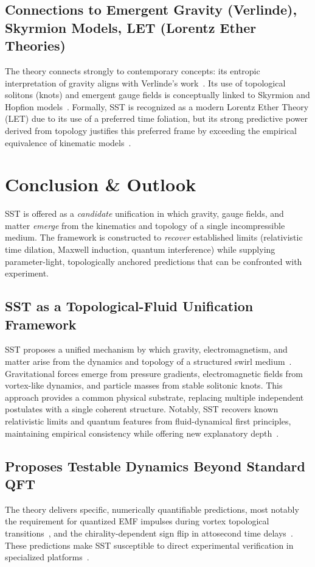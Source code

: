 \documentclass[10pt,reprint,aps,onecolumn,nofootinbib]{revtex4-2}
\begin{document}
\subsection*{Connections to Emergent Gravity (Verlinde), Skyrmion Models, LET (Lorentz Ether Theories)}
The theory connects strongly to contemporary concepts: its entropic interpretation of gravity aligns with Verlinde’s work~\cite{3}. Its use of topological solitons (knots) and emergent gauge fields is conceptually linked to Skyrmion and Hopfion models~\cite{4}. Formally, SST is recognized as a modern Lorentz Ether Theory (LET) due to its use of a preferred time foliation, but its strong predictive power derived from topology justifies this preferred frame by exceeding the empirical equivalence of kinematic models~\cite{4}.

\section{Conclusion \& Outlook}
\label{sec:conclusion}
SST is offered as a \emph{candidate} unification in which gravity, gauge fields, and matter \emph{emerge} from the kinematics and topology of a single incompressible medium. The framework is constructed to \emph{recover} established limits (relativistic time dilation, Maxwell induction, quantum interference) while supplying parameter-light, topologically anchored predictions that can be confronted with experiment.


\subsection*{SST as a Topological-Fluid Unification Framework}
    SST proposes a unified mechanism by which gravity, electromagnetism, and matter arise from the dynamics and topology of a structured swirl medium~\cite{1}. Gravitational forces emerge from pressure gradients, electromagnetic fields from vortex-like dynamics, and particle masses from stable solitonic knots. This approach provides a common physical substrate, replacing multiple independent postulates with a single coherent structure. Notably, SST recovers known relativistic limits and quantum features from fluid-dynamical first principles, maintaining empirical consistency while offering new explanatory depth~\cite{1}.


\subsection*{Proposes Testable Dynamics Beyond Standard QFT}
The theory delivers specific, numerically quantifiable predictions, most notably the requirement for quantized EMF impulses during vortex topological transitions~\cite{2}, and the chirality-dependent sign flip in attosecond time delays~\cite{6}. These predictions make SST susceptible to direct experimental verification in specialized platforms~\cite{2}.
\end{document}
